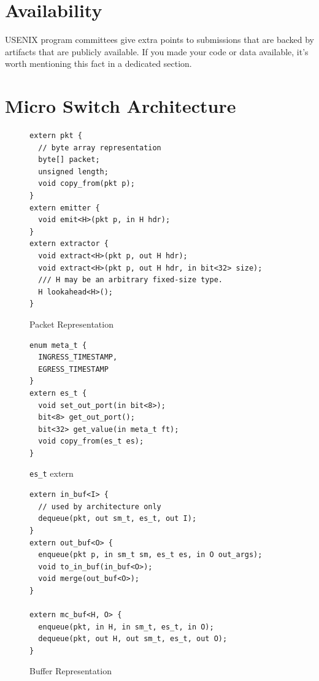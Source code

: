 \section*{Availability}

USENIX program committees give extra points to submissions that are
backed by artifacts that are publicly available. If you made your code
or data available, it's worth mentioning this fact in a dedicated
section.





\appendix
\section{Micro Switch Architecture}
\begin{figure}
\begin{lstlisting}[frame=none]
extern pkt {
  // byte array representation
  byte[] packet;
  unsigned length;
  void copy_from(pkt p);
}
extern emitter {
  void emit<H>(pkt p, in H hdr);
}
extern extractor {
  void extract<H>(pkt p, out H hdr);
  void extract<H>(pkt p, out H hdr, in bit<32> size);
  /// H may be an arbitrary fixed-size type.
  H lookahead<H>();
}
\end{lstlisting}
\caption{Packet Representation}
\label{fig:pkt-externs}
\end{figure}
\begin{figure}

\begin{lstlisting}[frame=none]
enum meta_t {
  INGRESS_TIMESTAMP,
  EGRESS_TIMESTAMP
}
extern es_t {
  void set_out_port(in bit<8>);
  bit<8> get_out_port();
  bit<32> get_value(in meta_t ft);
  void copy_from(es_t es);
}
\end{lstlisting}
\caption{\texttt{es\_t} extern}
\label{fig:msa-egress-spec-extern}
\end{figure}
\begin{figure}
\begin{lstlisting}[frame=none]
extern in_buf<I> {
  // used by architecture only
  dequeue(pkt, out sm_t, es_t, out I);
}
extern out_buf<O> {
  enqueue(pkt p, in sm_t sm, es_t es, in O out_args);
  void to_in_buf(in_buf<O>);
  void merge(out_buf<O>);
}

extern mc_buf<H, O> {
  enqueue(pkt, in H, in sm_t, es_t, in O);
  dequeue(pkt, out H, out sm_t, es_t, out O);
}
\end{lstlisting}
\caption{Buffer Representation}
\label{fig:pkt-buf}
\end{figure}

